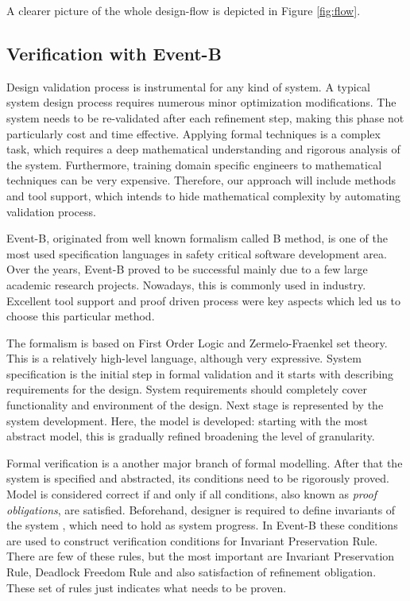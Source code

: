 \documentclass[conference]{IEEEtran}
\begin{document}
A clearer picture of the whole design-flow is depicted in Figure \ref{fig:flow}.

\subsection{Verification with Event-B}
Design validation process is instrumental for any kind of system. A typical system design process requires numerous minor optimization modifications. The system needs to be re-validated after each refinement step, making this phase not particularly cost and time effective. Applying formal techniques is a complex task, which requires a deep mathematical understanding and rigorous analysis of the system. Furthermore, training domain specific engineers to mathematical techniques can be very expensive. Therefore, our approach will include methods and tool support, which intends to hide mathematical complexity by automating validation process. 

Event-B, originated from well known formalism called B method, is one of the most used specification languages in safety critical software development area. Over the years, Event-B proved to be successful mainly due to a few large academic research projects. Nowadays, this is commonly used in industry. Excellent tool support and proof driven process were key aspects which led us to choose this particular method.

The formalism is based on First Order Logic and Zermelo-Fraenkel set theory. This is a relatively high-level language, although very expressive. System specification is the initial step in formal validation and it starts with describing requirements for the design. System requirements should completely cover functionality and environment of the design. Next stage is represented by the system development. Here, the model is developed: starting with the most abstract model, this is gradually refined broadening the level of granularity.

Formal verification is a another major branch of formal modelling. After that the system is specified and abstracted, its conditions need to be rigorously proved. Model is considered correct if and only if all conditions, also known as \textit{proof obligations}, are satisfied. Beforehand, designer is required to define invariants of the system , which need to hold as system progress. In Event-B these conditions are used to construct verification conditions for Invariant Preservation Rule. There are few of these rules, but the most important are Invariant Preservation Rule, Deadlock Freedom Rule and also satisfaction of refinement obligation. These set of rules just indicates what needs to be proven.
\end{document}
